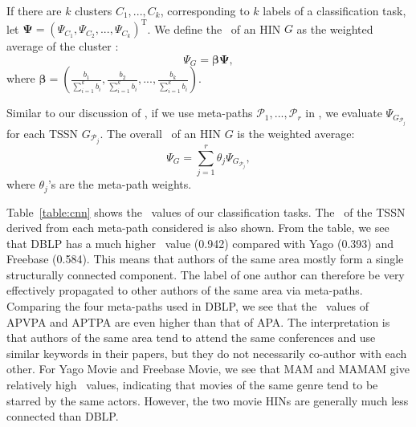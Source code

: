 If there are $k$ clusters $C_1, ..., C_k$, corresponding to  $k$ labels of a classification task, 
let $\bm{\Psi} = (\Psi_{C_1}, \Psi_{C_2}, ..., \Psi_{C_k})^\mathrm{T}$. 
We define the \cnn\ of an HIN $G$ as the weighted average of the cluster \cnn:
\begin{equation}
\Psi_G = \bm{\beta}\bm{\Psi},
\end{equation}
where $\bm{\beta} = (\frac{b_1}{\sum_{i=1}^k b_i}, \frac{b_2}{\sum_{i=1}^k b_i}, ..., \frac{b_k}{\sum_{i=1}^k b_i})$.

Similar to our discussion of \chn,
if we use meta-paths $\mathcal{P}_1, ..., \mathcal{P}_r$ in \tc, we evaluate 
 $\Psi_{G_{\mathcal{P}_j}}$ for each TSSN $G_{\mathcal{P}_j}$.
The overall
\cnn\ of an HIN $G$ is the weighted average:
\begin{equation}
\Psi_{G} = \sum_{j=1}^r \theta_j \Psi_{G_{\mathcal{P}_j}},
\end{equation}
where $\theta_j$'s are the meta-path weights.

Table~\ref{table:cnn} shows the \cnn\ values of our classification tasks. 
The \cnn\ of the TSSN derived from each meta-path considered is also shown.
From the table, we see that DBLP has a much higher \cnn\ value (0.942) compared with
Yago (0.393) and Freebase (0.584). 
This means that authors of the same area mostly form a single structurally connected component.
The label of one author can therefore be very effectively propagated to other authors of the same area via meta-paths. 
Comparing the four meta-paths used in DBLP, we see that the \cnn\ values of APVPA and APTPA are even higher than that of APA.
The interpretation is that authors of the same area tend to attend the same conferences and use similar keywords in their papers,
but they do not necessarily co-author with each other. 
For Yago Movie and Freebase Movie, we see that MAM and MAMAM give relatively high \cnn\ values,
indicating that movies of the same genre tend to be starred by the same actors. 
However, the two movie HINs are generally much less connected than DBLP. 

